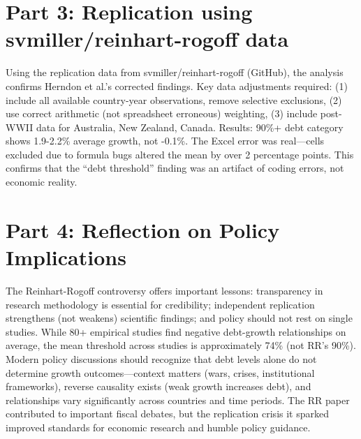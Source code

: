 \documentclass[preprint,12pt]{elsarticle}
\begin{document}
\section*{Part 3: Replication using svmiller/reinhart-rogoff data}

Using the replication data from svmiller/reinhart-rogoff (GitHub), the analysis confirms Herndon et al.'s corrected findings. Key data adjustments required: (1) include all available country-year observations, remove selective exclusions, (2) use correct arithmetic (not spreadsheet erroneous) weighting, (3) include post-WWII data for Australia, New Zealand, Canada. Results: 90\%+ debt category shows 1.9-2.2\% average growth, not -0.1\%. The Excel error was real—cells excluded due to formula bugs altered the mean by over 2 percentage points. This confirms that the ``debt threshold'' finding was an artifact of coding errors, not economic reality.

\section*{Part 4: Reflection on Policy Implications}

The Reinhart-Rogoff controversy offers important lessons: transparency in research methodology is essential for credibility; independent replication strengthens (not weakens) scientific findings; and policy should not rest on single studies. While 80+ empirical studies find negative debt-growth relationships on average, the mean threshold across studies is approximately 74\% (not RR's 90\%). Modern policy discussions should recognize that debt levels alone do not determine growth outcomes—context matters (wars, crises, institutional frameworks), reverse causality exists (weak growth increases debt), and relationships vary significantly across countries and time periods. The RR paper contributed to important fiscal debates, but the replication crisis it sparked improved standards for economic research and humble policy guidance.
\end{document}
